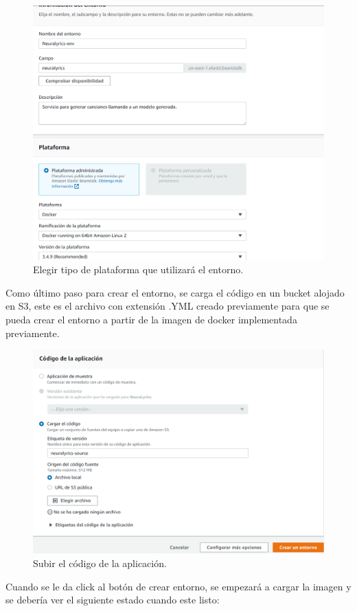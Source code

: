 \documentclass[12pt, a4paper, titlepage]{report}
\begin{document}
\begin{figure}[H]
	\includegraphics[width=12cm]{./imagenes/Desarrollo/BackEnd/paso_3.png}
	\centering 
	\caption{Elegir tipo de plataforma que utilizará el entorno.}
\end{figure}
Como último paso para crear el entorno, se carga el código en un bucket alojado en S3, este es el archivo con extensión .YML creado previamente para que se pueda crear el entorno a partir de la imagen de docker implementada previamente.
\begin{figure}[H]
	\includegraphics[width=12cm]{./imagenes/Desarrollo/BackEnd/paso_4.png}
	\centering 
	\caption{Subir el código de la aplicación.}
\end{figure}
Cuando se le da click al botón de crear entorno, se empezará a cargar la imagen y se debería ver el siguiente estado cuando este listo:
\end{document}
